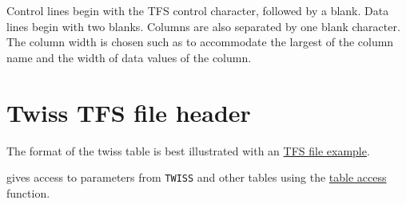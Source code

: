 Control lines begin with the TFS control character, followed by a
blank. Data lines begin with two blanks. Columns are also separated by
one blank character. The column width is chosen such as to accommodate
the largest of the column name and the width of data values of the column.  



\section{Twiss TFS file header}
\label{sec:tfs_twiss}
 
The format of the twiss table is best illustrated with an
\href{select.html#tfs}{TFS file example}.  

\madx gives access to parameters from {\tt TWISS} and other tables using the
\href{../Introduction/expression.html#table}{table access} function.  


